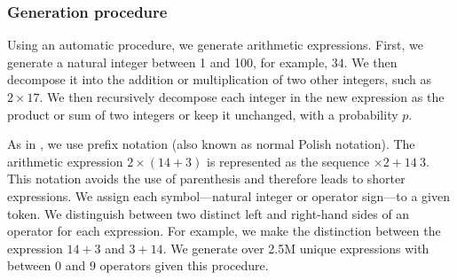 \subsubsection{Generation procedure}

Using an automatic procedure, we generate arithmetic expressions. First, we generate a natural integer between 1 and 100, for example, $34$. We then decompose it into the addition or multiplication of two other integers, such as $2 \times 17$. We then recursively decompose each integer in the new expression as the product or sum of two integers or keep it unchanged, with a probability $p$.


As in \textcite{lample_20}, we use prefix notation (also known as normal Polish notation). The arithmetic expression $2 \times (14 + 3)$ is represented as the sequence $\times 2 + 14 \: 3$. This notation avoids the use of parenthesis and therefore leads to shorter expressions. We assign each symbol—natural integer or operator sign—to a given token. We distinguish between two distinct left and right-hand sides of an operator for each expression. For example, we make the distinction between the expression $14 + 3$ and $3 + 14$. We generate over 2.5M unique expressions with between 0 and 9 operators given this procedure.

